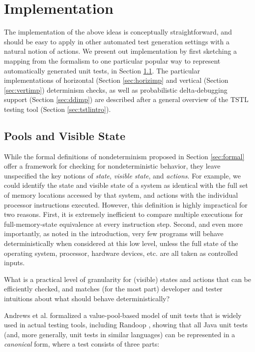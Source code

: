 \section{Implementation}

The implementation of the above ideas is conceptually straightforward,
and should be easy to apply in other automated test generation
settings with a natural notion of actions.  We present out
implementation by first sketching a mapping from the formalism to one
particular popular way to represent automatically generated unit
tests, in Section \ref{sec:pools}.  The particular implementations of
horizontal (Section \ref{sec:horizimp} and vertical (Section
\ref{sec:vertimp}) determinism checks, as well as probabilistic
delta-debugging support (Section \ref{sec:ddimp}) are described after a general
overview of the TSTL testing tool (Section \ref{sec:tstlintro}).

\subsection{Pools and Visible State}
\label{sec:pools}

While the formal definitions of nondeterminism proposed in Section
\ref{sec:formal} offer a framework for checking for nondeterministic
behavior, they leave unspecified the key notions of \emph{state},
\emph{visible state}, and \emph{actions}.  For example, we could
identify the state and visible state of a system as identical with the
full set of memory locations accessed by that system, and actions with the
individual processor instructions executed.  However, this
definition is highly impractical for two reasons.  First, it is
extremely inefficient to compare multiple executions for
full-memory-state equivalence at every instruction step.  Second, and
even more importantly, as noted in the introduction, very few programs
will behave deterministically when considered at this low level,
unless the full state of the operating system, processor, hardware
devices, etc. are all taken as controlled inputs.

What is a practical level of granularity for (visible) states and actions that
can be efficiently checked, and matches (for the most part) developer
and tester intuitions about what should behave deterministically?

Andrews et al. formalized a value-pool-based model of unit tests that is widely used in
actual testing tools, including Randoop \cite{Pacheco}, showing that
all Java unit tests (and, more generally, unit tests in similar
languages) can be represented in a \emph{canonical} form, where
a test consists of three parts:

